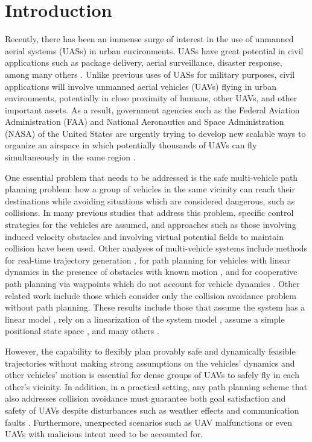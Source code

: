 \section{Introduction}
Recently, there has been an immense surge of interest in the use of unmanned aerial systems (UASs) in urban environments. 
UASs have great potential in civil applications such as package delivery, aerial surveillance, disaster response, among many others .%
Unlike previous uses of UASs for military purposes, civil applications will involve unmanned aerial vehicles (UAVs) flying in urban environments, potentially in close proximity of humans, other UAVs, and other important assets. 
As a result, government agencies such as the Federal Aviation Administration (FAA) and National Aeronautics and Space Administration (NASA) of the United States are urgently trying to develop new scalable ways to organize an airspace in which potentially thousands of UAVs can fly simultaneously in the same region \cite{FAA13, Kopardekar16}.

One essential problem that needs to be addressed is the safe multi-vehicle path planning problem: how a group of vehicles in the same vicinity can reach their destinations while avoiding situations which are considered dangerous, such as collisions. In many previous studies that address this problem, specific control strategies for the vehicles are assumed, and approaches such as those involving induced velocity obstacles \cite{Fiorini98, Vandenberg08,Wu2012} and involving virtual potential fields to maintain collision \cite{Olfati-Saber2002, Chuang07} have been used. Other analyses of multi-vehicle systems include methods for real-time trajectory generation \cite{Feng-LiLian2002}, for path planning for vehicles with linear dynamics in the presence of obstacles with known motion \cite{Ahmadzadeh2009}, and for cooperative path planning via waypoints which do not account for vehicle dynamics \cite{Bellingham}. Other related work include those which consider only the collision avoidance problem without path planning. These results include those that assume the system has a linear model \cite{Beard2003, Schouwenaars2004, Stipanovic2007}, rely on a linearization of the system model \cite{Massink2001, Althoff2011}, assume a simple positional state space \cite{Lin2015}, and many others \cite{Lalish2008, Hoffmann2008, Chen2016}.

However, the capability to flexibly plan provably safe and dynamically feasible trajectories without making strong assumptions on the vehicles' dynamics and other vehicles' motion is essential for dense groups of UAVs to safely fly in each other's vicinity. In addition, in a practical setting, any path planning scheme that also addresses collision avoidance must guarantee both goal satisfaction and safety of UAVs despite disturbances such as weather effects and communication faults \cite{Kopardekar16}. Furthermore, unexpected scenarios such as UAV malfunctions or even UAVs with malicious intent need to be accounted for.

